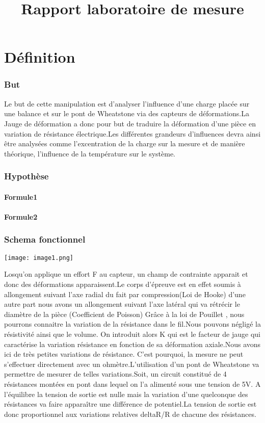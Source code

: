 \documentclass[11pt,a4paper]{report}
\begin{document}
\title{Rapport laboratoire de mesure}
\chapter{Définition}	
\subsection{But}
\begin{frame}
Le but de cette manipulation est d'analyser l'influence d'une charge placée sur une balance et sur le pont de Wheatstone via des capteurs de déformations.La Jauge de déformation a donc pour but de traduire la déformation d'une pièce en variation de résistance électrique.Les différentes grandeurs d'influences devra ainsi être analysées comme l'excentration de la charge sur la mesure et de manière théorique, l'influence de la température sur le système.
\subsection{Hypothèse}

\subsubsection{Formule1}
\subsubsection{Formule2}
\subsection{Schema fonctionnel}
\begin{center}
\texttt{[image: image1.png]}
\end{center}
\begin{Frame}
Losqu'on applique un effort F au capteur, un champ de contrainte apparait et donc des déformations apparaissent.Le corps d'épreuve est en effet soumis à allongement suivant l'axe radial du fait par compression(Loi de Hooke) d'une autre part nous avons un allongement suivant l'axe latéral qui va rétrécir le diamètre de la pièce (Coefficient de Poisson) Grâce à la loi de Pouillet , nous pourrons connaitre la variation de la résistance dans le fil.Nous pouvons négligé la résistivité ainsi que le volume. On introduit alors K qui est le facteur de jauge qui caractérise la variation résistance en fonction de sa déformation axiale.Nous avons ici de très petites variations de résistance.
C'est pourquoi, la mesure ne peut s'effectuer directement avec un ohmètre.L'utilisation d'un pont de Wheatstone va permettre de mesurer de telles variations.Soit, un circuit constitué de 4 résistances montées en pont dans lequel on l'a alimenté sous une tension de 5V. A l'équilibre la tension de sortie est nulle mais la variation d'une quelconque des résistances va faire apparaître une différence de potentiel.La tension de sortie est donc proportionnel aux variations relatives deltaR/R de chacune des résistances. 
\end{Frame}

\end{frame}
\end{document}
